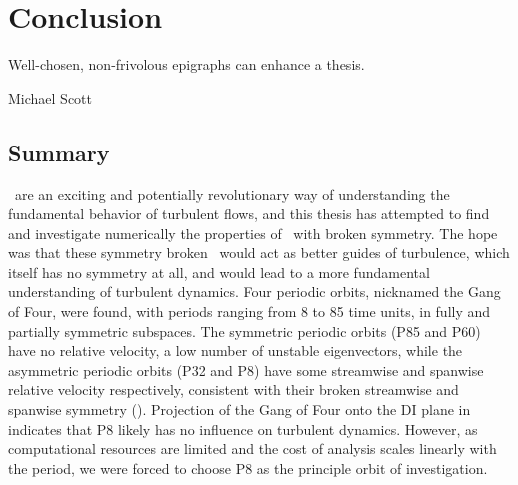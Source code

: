 \chapter*{Conclusion}
	\setcounter{chapter}{5}
	\setcounter{section}{0}
	\epigraph{
	Well-chosen, non-frivolous epigraphs can enhance a thesis.
	}{Michael Scott} 

\section{Summary}

\Ecs\ are an exciting and potentially revolutionary way of understanding the fundamental behavior of turbulent flows, and this thesis has attempted to find and investigate numerically the properties of \ecs\ with broken symmetry. The hope was that these symmetry broken \ecs\ would act as better guides of turbulence, which itself has no symmetry at all, and would lead to a more fundamental understanding of turbulent dynamics. Four periodic orbits, nicknamed the Gang of Four, were found, with periods ranging from 8 to 85 time units, in fully and partially symmetric subspaces. The symmetric periodic orbits (P85 and P60) have no relative velocity, a low number of unstable eigenvectors, while the asymmetric periodic orbits (P32 and P8) have some streamwise and spanwise relative velocity respectively, consistent with their broken streamwise and spanwise symmetry ().  Projection of the Gang of Four onto the DI plane in  indicates that P8 likely has no influence on turbulent dynamics. However, as computational resources are limited and the cost of analysis scales linearly with the period, we were forced to choose P8 as the principle orbit of investigation. \\ 

